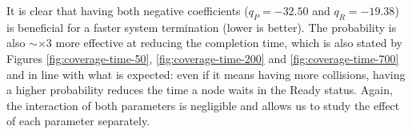 It is clear that having both negative coefficients ($q_P = -32.50$ and $q_R = -19.38$) is beneficial for a faster system termination (lower is better). The probability is also $\sim\times 3$ more effective at reducing the completion time, which is also stated by Figures \ref{fig:coverage-time-50}, \ref{fig:coverage-time-200} and \ref{fig:coverage-time-700} and in line with what is expected: even if it means having more collisions, having a higher probability reduces the time a node waits in the Ready status. Again, the interaction of both parameters is negligible and allows us to study the effect of each parameter separately.